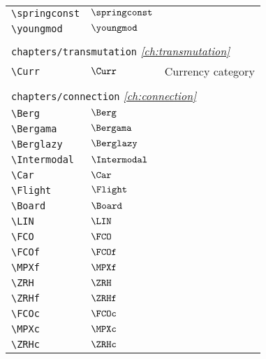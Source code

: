 \begin{longtable}{lll}
 {\color[rgb]{0.5,0.5,0.5}\texttt{\textbackslash springconst}} & $\springconst$ & \\ 
 {\color[rgb]{0.5,0.5,0.5}\texttt{\textbackslash youngmod}} & $\youngmod$ & \\ 
  &  & \\ 
 \multicolumn{3}{l}{{\color[rgb]{0.5,0.5,0.5}\texttt{chapters/transmutation}} \emph{\cref{ch:transmutation}}}\\ 
 \hline
{\color[rgb]{0.5,0.5,0.5}\texttt{\textbackslash Curr}} & $\Curr$ &  Currency category\\ 
  &  & \\ 
 \multicolumn{3}{l}{{\color[rgb]{0.5,0.5,0.5}\texttt{chapters/connection}} \emph{\cref{ch:connection}}}\\ 
 \hline
{\color[rgb]{0.5,0.5,0.5}\texttt{\textbackslash Berg}} & $\Berg$ & \\ 
 {\color[rgb]{0.5,0.5,0.5}\texttt{\textbackslash Bergama}} & $\Bergama$ & \\ 
 {\color[rgb]{0.5,0.5,0.5}\texttt{\textbackslash Berglazy}} & $\Berglazy$ & \\ 
 {\color[rgb]{0.5,0.5,0.5}\texttt{\textbackslash Intermodal}} & $\Intermodal$ & \\ 
 {\color[rgb]{0.5,0.5,0.5}\texttt{\textbackslash Car}} & $\Car$ & \\ 
 {\color[rgb]{0.5,0.5,0.5}\texttt{\textbackslash Flight}} & $\Flight$ & \\ 
 {\color[rgb]{0.5,0.5,0.5}\texttt{\textbackslash Board}} & $\Board$ & \\ 
 {\color[rgb]{0.5,0.5,0.5}\texttt{\textbackslash LIN}} & $\LIN$ & \\ 
 {\color[rgb]{0.5,0.5,0.5}\texttt{\textbackslash FCO}} & $\FCO$ & \\ 
 {\color[rgb]{0.5,0.5,0.5}\texttt{\textbackslash FCOf}} & $\FCOf$ & \\ 
 {\color[rgb]{0.5,0.5,0.5}\texttt{\textbackslash MPXf}} & $\MPXf$ & \\ 
 {\color[rgb]{0.5,0.5,0.5}\texttt{\textbackslash ZRH}} & $\ZRH$ & \\ 
 {\color[rgb]{0.5,0.5,0.5}\texttt{\textbackslash ZRHf}} & $\ZRHf$ & \\ 
 {\color[rgb]{0.5,0.5,0.5}\texttt{\textbackslash FCOc}} & $\FCOc$ & \\ 
 {\color[rgb]{0.5,0.5,0.5}\texttt{\textbackslash MPXc}} & $\MPXc$ & \\ 
 {\color[rgb]{0.5,0.5,0.5}\texttt{\textbackslash ZRHc}} & $\ZRHc$ & \\ 

\end{longtable}
